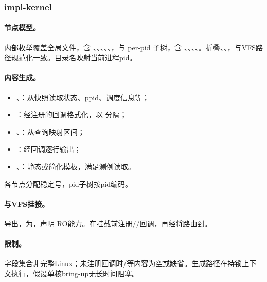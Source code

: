 
\subsubsection{impl-kernel}

\paragraph{节点模型。}
内部枚举覆盖全局文件，含 、、、、、，与 per-pid 子树，含 、、、、。折叠\code{//}、、，与VFS路径规范化一致。目录名映射当前进程pid。

\paragraph{内容生成。}
\begin{itemize}
 \item {}、：从快照读取状态、ppid、调度信息等；
 \item {}：经注册的回调格式化，以  分隔；
 \item {}、：从查询映射区间；
 \item {}：经回调逐行输出；
 \item {}、：静态或简化模板，满足测例读取。
\end{itemize}
各节点分配稳定号，pid子树按pid编码。

\paragraph{与VFS挂接。}
导出，为，声明 RO能力。在挂载前注册//回调，再经将路由到。

\paragraph{限制。}
字段集合非完整Linux；未注册回调时/等内容为空或缺省。生成路径在持锁上下文执行，假设单核bring-up无长时间阻塞。
